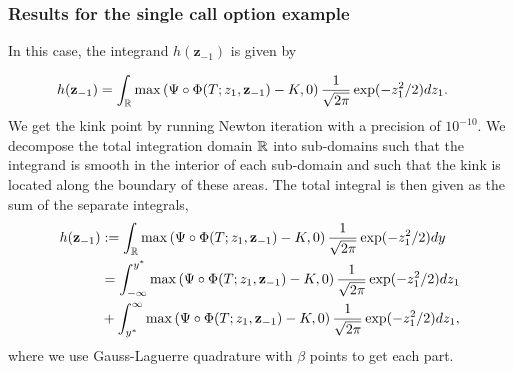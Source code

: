 

\FloatBarrier
\subsubsection{Results for the single call option example}\label{sec:Results for the call option example}
In this case, the integrand $h(\mathbf{z}_{-1})$ is given by

\begin{align}\label{smoothed_integrand_call_opt_2}
h(\mathbf{z}_{-1})&= \int_{\mathbb{R}}  \max \left(\Psi \circ \Phi(T;z_1,\mathbf{z}_{-1})-K,0\right) \frac{1}{\sqrt{2 \pi}} \operatorname{exp}(-z_1^2/2) dz_1 .
\end{align}
We get the kink point by running Newton iteration with a precision of $10^{-10}$. We  decompose the total integration domain $\mathbb{R}$  into sub-domains such that the integrand is smooth in the interior of  each sub-domain and such that the kink is located along the boundary of these areas. The total integral is then given as the sum of the separate integrals, \ie
\begin{align}
	h(\mathbf{z}_{-1}) &:=  \int_{\mathbb{R}} \max \left(\Psi \circ \Phi(T;z_1,\mathbf{z}_{-1})-K,0\right) \frac{1}{\sqrt{2 \pi}} \operatorname{exp}(-z_1^2/2) dy \\ \nonumber
	&=\int_{-\infty}^{y^{\ast}} \max \left(\Psi \circ \Phi(T;z_1,\mathbf{z}_{-1})-K,0\right) \frac{1}{\sqrt{2 \pi}} \operatorname{exp}(-z_1^2/2) dz_1\\ \nonumber
	&+\int_{y^{\ast}}^{\infty} \max \left(\Psi \circ \Phi(T;z_1,\mathbf{z}_{-1})-K,0\right) \frac{1}{\sqrt{2 \pi}} \operatorname{exp}(-z_1^2/2) dz_1,
\end{align}
where we use Gauss-Laguerre quadrature with $\beta$ points to get each part.


